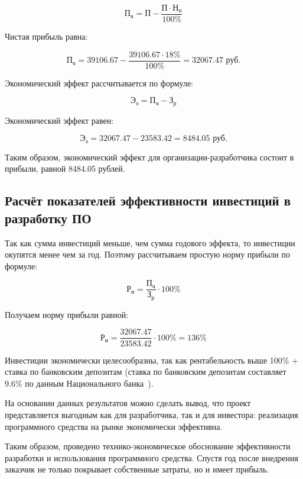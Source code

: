 \begin{equation}
    \textit{П}_\textit{ч} = \textit{П} - \frac{\textit{П} \cdot \textit{Н}_\textit{п}}{100\%}
\end{equation}

Чистая прибыль равна:

\begin{equation*}
    \textit{П}_\textit{ч} = 39106.67 - \frac{39106.67 \cdot 18\%}{100\%} = 32067.47 \textrm{ руб.}
\end{equation*}

Экономический эффект рассчитывается по формуле:

\begin{equation}
    \textit{Э}_\textit{э} = \textit{П}_\textit{ч} - \textit{З}_\textit{р}
\end{equation}

Экономический эффект равен:

\begin{equation*}
    \textit{Э}_\textit{э} = 32067.47 - 23583.42 = 8484.05 \textrm{ руб.}
\end{equation*}

Таким образом, экономический эффект для организации-разработчика состоит в прибыли, равной 8484.05 рублей.

\subsection{Расчёт показателей эффективности инвестиций в разработку ПО}

Так как сумма инвестиций меньше, чем сумма годового эффекта, то инвестиции окупятся менее чем за год. Поэтому рассчитываем простую норму прибыли по формуле:

\begin{equation}
    \textit{Р}_\textit{и} = \frac{\textit{П}_\textit{ч}}{\textit{З}_\textit{р}} \cdot 100\%
\end{equation}

Получаем норму прибыли равной:

\begin{equation*}
    \textit{Р}_\textit{и} = \frac{32067.47}{23583.42} \cdot 100\% = 136\%
\end{equation*}

Инвестиции экономически целесообразны, так как рентабельность выше 100\% + ставка по банковским депозитам (ставка по банковским депозитам составляет 9.6\% по данным Национального банка~\cite{nbrb}).

На основании данных результатов можно сделать вывод, что проект представляется выгодным как для разработчика, так и для инвестора: реализация программного средства на рынке экономически эффективна.

Таким образом, проведено технико-экономическое обоснование эффективности разработки и использования программного средства. Спустя год после внедрения заказчик не только покрывает собственные затраты, но и имеет прибыль.
